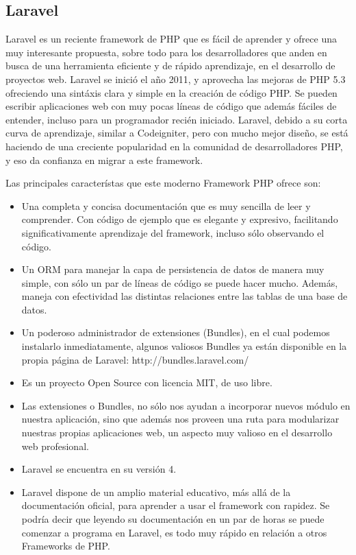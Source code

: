  \newpage

\subsection{Laravel}

Laravel es un reciente framework de PHP que es fácil de aprender y ofrece una muy interesante propuesta, sobre todo para los desarrolladores que anden en busca de una herramienta eficiente y de rápido aprendizaje, en el desarrollo de proyectos web.
Laravel se inició el año 2011, y aprovecha las mejoras de PHP 5.3 ofreciendo una sintáxis clara y simple en la creación de código PHP. Se pueden escribir aplicaciones web con muy pocas líneas de código que además fáciles de entender, incluso para un programador recién iniciado.
Laravel, debido a su corta curva de aprendizaje, similar a Codeigniter, pero con mucho mejor diseño, se está haciendo de una creciente popularidad en la comunidad de desarrolladores PHP, y eso da confianza en migrar a este framework.

Las principales característas que este moderno Framework PHP ofrece son:


\begin{itemize}

\item Una completa y concisa documentación que es muy sencilla de leer y comprender. Con código de ejemplo que es elegante y expresivo, facilitando significativamente aprendizaje del framework, incluso sólo observando el código.
\item Un ORM para manejar la capa de persistencia de datos de manera muy simple, con sólo un par de líneas de código se puede hacer mucho. Además, maneja con efectividad las distintas relaciones entre las tablas de una base de datos.
\item Un poderoso administrador de extensiones (Bundles), en el cual podemos instalarlo inmediatamente, algunos valiosos Bundles ya están disponible en la propia página de Laravel: http://bundles.laravel.com/
\item Es un proyecto Open Source con licencia MIT, de uso libre.
\item Las extensiones o Bundles, no sólo nos ayudan a incorporar nuevos módulo en nuestra aplicación, sino que además nos proveen una ruta para modularizar nuestras propias aplicaciones web, un aspecto muy valioso en el desarrollo web profesional.
\item Laravel se encuentra en su versión 4. 
\item Laravel dispone de un amplio material educativo, más allá de la documentación oficial, para aprender a usar el framework con rapidez. Se podría decir que leyendo su documentación en un par de horas se puede comenzar a programa en Laravel, es todo muy rápido en relación a otros Frameworks de PHP.

\end{itemize}